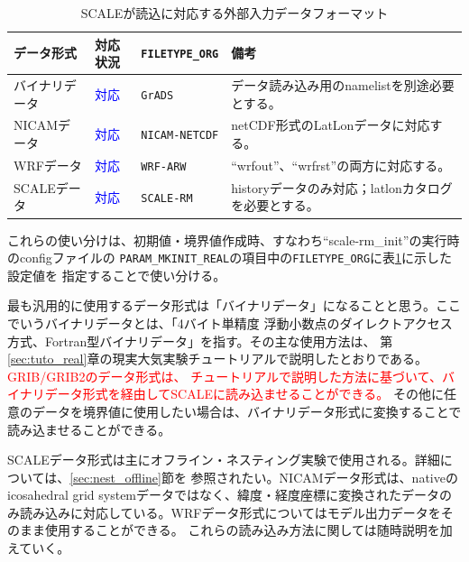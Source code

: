 \begin{table}[htb]
\begin{center}
\caption{SCALEが読込に対応する外部入力データフォーマット}
\begin{tabularx}{150mm}{|l|l|l|X|} \hline
 \rowcolor[gray]{0.9} データ形式 & 対応状況 & \verb|FILETYPE_ORG| & 備考 \\ \hline
 バイナリデータ & \textcolor{blue}{対応} & \verb|GrADS| & データ読み込み用のnamelistを別途必要とする。 \\ \hline
 NICAMデータ & \textcolor{blue}{対応} & \verb|NICAM-NETCDF| & netCDF形式のLatLonデータに対応する。 \\ \hline
 WRFデータ & \textcolor{blue}{対応} & \verb|WRF-ARW| & ``wrfout''、``wrfrst''の両方に対応する。 \\ \hline
 SCALEデータ & \textcolor{blue}{対応} & \verb|SCALE-RM| & historyデータのみ対応；latlonカタログを必要とする。 \\ \hline
\end{tabularx}
\label{tab:inputdata_format}
\end{center}
\end{table}

これらの使い分けは、初期値・境界値作成時、すなわち``scale-rm\_init''の実行時のconfigファイルの
\verb|PARAM_MKINIT_REAL|の項目中の\verb|FILETYPE_ORG|に表\ref{tab:inputdata_format}に示した設定値を
指定することで使い分ける。

最も汎用的に使用するデータ形式は「バイナリデータ」になることと思う。ここでいうバイナリデータとは、「4バイト単精度
浮動小数点のダイレクトアクセス方式、Fortran型バイナリデータ」を指す。その主な使用方法は、
第\ref{sec:tuto_real}章の現実大気実験チュートリアルで説明したとおりである。\textcolor{red}{GRIB/GRIB2のデータ形式は、
チュートリアルで説明した方法に基づいて、バイナリデータ形式を経由してSCALEに読み込ませることができる。}
その他に任意のデータを境界値に使用したい場合は、バイナリデータ形式に変換することで読み込ませることができる。

SCALEデータ形式は主にオフライン・ネスティング実験で使用される。詳細については、\ref{sec:nest_offline}節を
参照されたい。NICAMデータ形式は、nativeのicosahedral grid systemデータではなく、緯度・経度座標に変換されたデータの
み読み込みに対応している。WRFデータ形式についてはモデル出力データをそのまま使用することができる。
これらの読み込み方法に関しては随時説明を加えていく。





